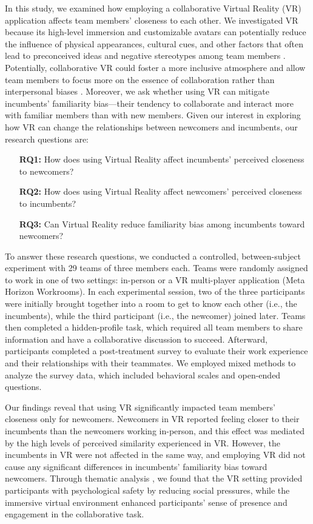 In this study, we examined how employing a collaborative Virtual Reality (VR) application affects team members' closeness to each other. We investigated VR because its high-level immersion and customizable avatars can potentially reduce the influence of physical appearances, cultural cues, and other factors that often lead to preconceived ideas and negative stereotypes among team members \cite{christofi2017virtual, higgins2023perspective, mal2023impact}. Potentially, collaborative VR could foster a more inclusive atmosphere and allow team members to focus more on the essence of collaboration rather than interpersonal biases \cite{latoschik2017effect}. Moreover, we ask whether using VR can mitigate incumbents' familiarity bias---their tendency to collaborate and interact more with familiar members than with new members. Given our interest in exploring how VR can change the relationships between newcomers and incumbents, our research questions are:
\begin{itemize}
    \item[\textbf{RQ1:}] How does using Virtual Reality affect incumbents' perceived closeness to newcomers?
    \item[\textbf{RQ2:}] How does using Virtual Reality affect newcomers' perceived closeness to incumbents?
    \item[\textbf{RQ3:}] Can Virtual Reality reduce familiarity bias among incumbents toward newcomers?
\end{itemize}

To answer these research questions, we conducted a controlled, between-subject experiment with 29 teams of three members each. Teams were randomly assigned to work in one of two settings: in-person or a VR multi-player application (Meta Horizon Workrooms). In each experimental session, two of the three participants were initially brought together into a room to get to know each other (i.e., the incumbents), while the third participant (i.e., the newcomer) joined later. Teams then completed a hidden-profile task, which required all team members to share information and have a collaborative discussion to succeed. Afterward, participants completed a post-treatment survey to evaluate their work experience and their relationships with their teammates. We employed mixed methods to analyze the survey data, which included behavioral scales and open-ended questions. 

Our findings reveal that using VR significantly impacted team members' closeness only for newcomers. Newcomers in VR reported feeling closer to their incumbents than the newcomers working in-person, and this effect was mediated by the high levels of perceived similarity experienced in VR. However, the incumbents in VR were not affected in the same way, and employing VR did not cause any significant differences in incumbents' familiarity bias toward newcomers. Through thematic analysis \cite{braun2006using}, we found that the VR setting provided participants with psychological safety by reducing social pressures, while the immersive virtual environment enhanced participants' sense of presence and engagement in the collaborative task. 

